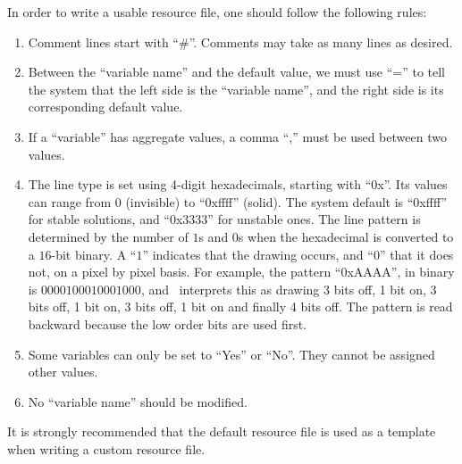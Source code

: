 In order to write a usable resource file, one should follow the following rules:
\begin{enumerate}
\item Comment lines start with ``\#''. Comments may take as many lines as desired.
\item Between the ``variable name'' and the default value, we must use 
``='' to tell the system that the left side is the ``variable name'', and
the right side is its corresponding default value.
\item If a ``variable'' has aggregate values, a comma ``,'' must be used between
two values.
\item The line type is set using 4-digit hexadecimals, starting with ``0x''. Its values can 
range from $0$ (invisible) to ``0xffff'' (solid). The system default is ``0xffff'' for stable
solutions, and ``0x3333'' for unstable ones. 
The line pattern is determined by the number of $1$s and $0$s when the hexadecimal
is converted to a $16$-bit binary. A ``$1$'' indicates that the drawing occurs, and ``$0$'' that 
it does not, on a pixel by pixel basis. For example, the pattern ``0xAAAA'', 
in binary is $0000100010001000$, and \PLAUT~interprets this as drawing 
3 bits off, 1 bit on, 3 bits off, 1 bit on, 3 bits off, 1 bit on and finally 4 bits off.
The pattern is read backward because the low order bits are used first.
\item Some variables can only be set to ``Yes'' or ``No''. They cannot be assigned other values.
\item No ``variable name'' should be  modified.
\end{enumerate}

It is strongly recommended that the default resource file is used as a template
when writing a custom resource file. 


